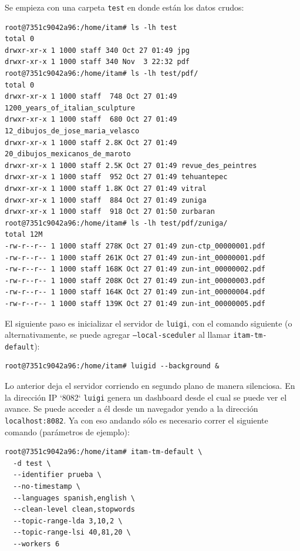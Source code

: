 Se empieza con una carpeta \texttt{test} en donde están los datos crudos:

\begin{lstlisting}
root@7351c9042a96:/home/itam# ls -lh test
total 0
drwxr-xr-x 1 1000 staff 340 Oct 27 01:49 jpg
drwxr-xr-x 1 1000 staff 340 Nov  3 22:32 pdf
root@7351c9042a96:/home/itam# ls -lh test/pdf/
total 0
drwxr-xr-x 1 1000 staff  748 Oct 27 01:49 1200_years_of_italian_sculpture
drwxr-xr-x 1 1000 staff  680 Oct 27 01:49 12_dibujos_de_jose_maria_velasco
drwxr-xr-x 1 1000 staff 2.8K Oct 27 01:49 20_dibujos_mexicanos_de_maroto
drwxr-xr-x 1 1000 staff 2.5K Oct 27 01:49 revue_des_peintres
drwxr-xr-x 1 1000 staff  952 Oct 27 01:49 tehuantepec
drwxr-xr-x 1 1000 staff 1.8K Oct 27 01:49 vitral
drwxr-xr-x 1 1000 staff  884 Oct 27 01:49 zuniga
drwxr-xr-x 1 1000 staff  918 Oct 27 01:50 zurbaran
root@7351c9042a96:/home/itam# ls -lh test/pdf/zuniga/
total 12M
-rw-r--r-- 1 1000 staff 278K Oct 27 01:49 zun-ctp_00000001.pdf
-rw-r--r-- 1 1000 staff 261K Oct 27 01:49 zun-int_00000001.pdf
-rw-r--r-- 1 1000 staff 168K Oct 27 01:49 zun-int_00000002.pdf
-rw-r--r-- 1 1000 staff 208K Oct 27 01:49 zun-int_00000003.pdf
-rw-r--r-- 1 1000 staff 164K Oct 27 01:49 zun-int_00000004.pdf
-rw-r--r-- 1 1000 staff 139K Oct 27 01:49 zun-int_00000005.pdf
\end{lstlisting}

El siguiente paso es inicializar el servidor de \texttt{luigi}, con el comando siguiente (o alternativamente, se puede agregar \texttt{--local-sceduler} al llamar \texttt{itam-tm-default}):

\begin{lstlisting}
root@7351c9042a96:/home/itam# luigid --background &
\end{lstlisting}

Lo anterior deja el servidor corriendo en segundo plano de manera silenciosa. En la dirección IP `8082` \texttt{luigi} genera un dashboard desde el cual se puede ver el avance. Se puede acceder a él desde un navegador yendo a la dirección \texttt{localhost:8082}. Ya con eso andando sólo es necesario correr el siguiente comando (parámetros de ejemplo):

\begin{lstlisting}
root@7351c9042a96:/home/itam# itam-tm-default \
  -d test \
  --identifier prueba \
  --no-timestamp \
  --languages spanish,english \
  --clean-level clean,stopwords
  --topic-range-lda 3,10,2 \
  --topic-range-lsi 40,81,20 \
  --workers 6
\end{lstlisting}

